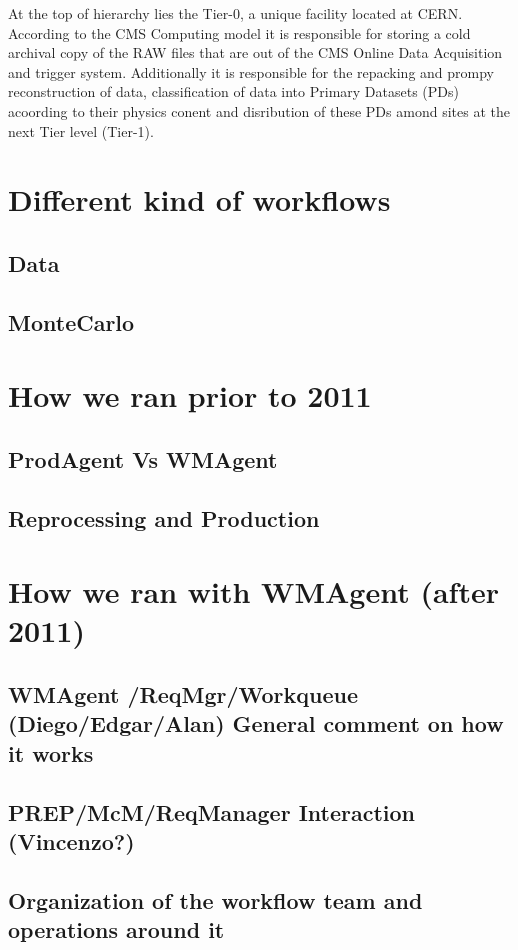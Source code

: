 \documentclass[journal, transmag]{IEEEtran}
\begin{document}
At the top of hierarchy lies the Tier-0, a unique facility located at CERN. According to the CMS Computing model it is responsible for storing a cold archival copy of the RAW files that are out of the CMS Online Data Acquisition and trigger system. Additionally it is responsible for the repacking and prompy reconstruction of data, classification of data into Primary Datasets (PDs) acoording to their physics conent and disribution of these PDs amond sites at the next Tier level (Tier-1).




\section{Different kind of workflows}

\subsection{Data}
\subsection{MonteCarlo}

\section{How we ran prior to 2011}
\subsection{ProdAgent Vs WMAgent}
\subsection{Reprocessing and Production}

\section{How we ran with WMAgent (after 2011)}
\subsection{WMAgent /ReqMgr/Workqueue (Diego/Edgar/Alan) General comment on how it works}
\subsection{PREP/McM/ReqManager Interaction (Vincenzo?)}
\subsection{Organization of the workflow team and operations around it }
\end{document}
